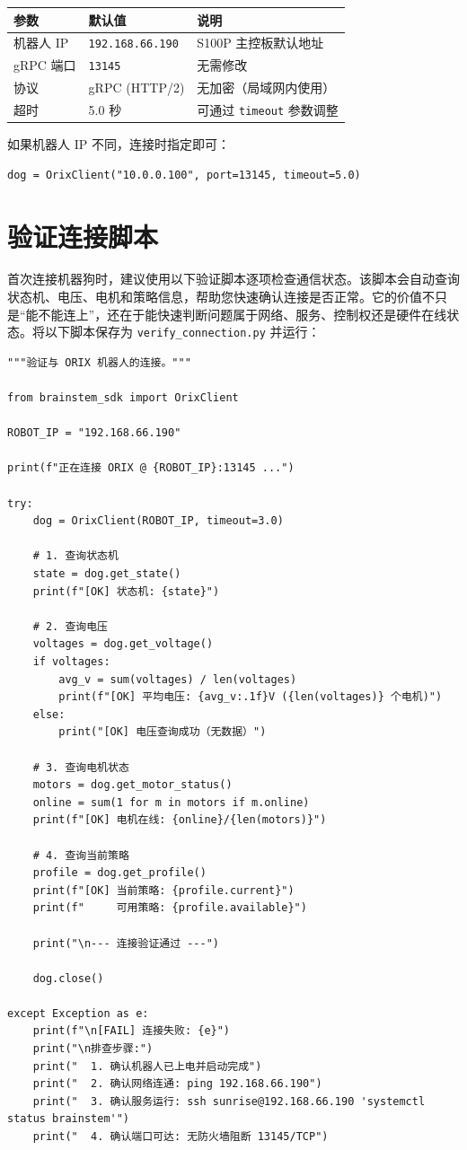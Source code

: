 \documentclass[a4paper,11pt,openany]{book}
\begin{document}
\begin{longtable}{lll}
\toprule
参数 & 默认值 & 说明 \\
\midrule
\endhead
机器人 IP & \texttt{192.168.66.190} & S100P 主控板默认地址 \\
gRPC 端口 & \texttt{13145} & 无需修改 \\
协议 & gRPC (HTTP/2) & 无加密（局域网内使用） \\
超时 & 5.0 秒 & 可通过 \texttt{timeout} 参数调整 \\
\bottomrule
\end{longtable}

如果机器人 IP 不同，连接时指定即可：

\begin{lstlisting}[style=python]
dog = OrixClient("10.0.0.100", port=13145, timeout=5.0)
\end{lstlisting}

\section{验证连接脚本}

首次连接机器狗时，建议使用以下验证脚本逐项检查通信状态。该脚本会自动查询状态机、电压、电机和策略信息，帮助您快速确认连接是否正常。它的价值不只是“能不能连上”，还在于能快速判断问题属于网络、服务、控制权还是硬件在线状态。将以下脚本保存为 \texttt{verify\_connection.py} 并运行：

\begin{lstlisting}[style=python]
"""验证与 ORIX 机器人的连接。"""

from brainstem_sdk import OrixClient

ROBOT_IP = "192.168.66.190"

print(f"正在连接 ORIX @ {ROBOT_IP}:13145 ...")

try:
    dog = OrixClient(ROBOT_IP, timeout=3.0)

    # 1. 查询状态机
    state = dog.get_state()
    print(f"[OK] 状态机: {state}")

    # 2. 查询电压
    voltages = dog.get_voltage()
    if voltages:
        avg_v = sum(voltages) / len(voltages)
        print(f"[OK] 平均电压: {avg_v:.1f}V ({len(voltages)} 个电机)")
    else:
        print("[OK] 电压查询成功（无数据）")

    # 3. 查询电机状态
    motors = dog.get_motor_status()
    online = sum(1 for m in motors if m.online)
    print(f"[OK] 电机在线: {online}/{len(motors)}")

    # 4. 查询当前策略
    profile = dog.get_profile()
    print(f"[OK] 当前策略: {profile.current}")
    print(f"     可用策略: {profile.available}")

    print("\n--- 连接验证通过 ---")

    dog.close()

except Exception as e:
    print(f"\n[FAIL] 连接失败: {e}")
    print("\n排查步骤:")
    print("  1. 确认机器人已上电并启动完成")
    print("  2. 确认网络连通: ping 192.168.66.190")
    print("  3. 确认服务运行: ssh sunrise@192.168.66.190 'systemctl status brainstem'")
    print("  4. 确认端口可达: 无防火墙阻断 13145/TCP")
\end{lstlisting}
\end{document}
